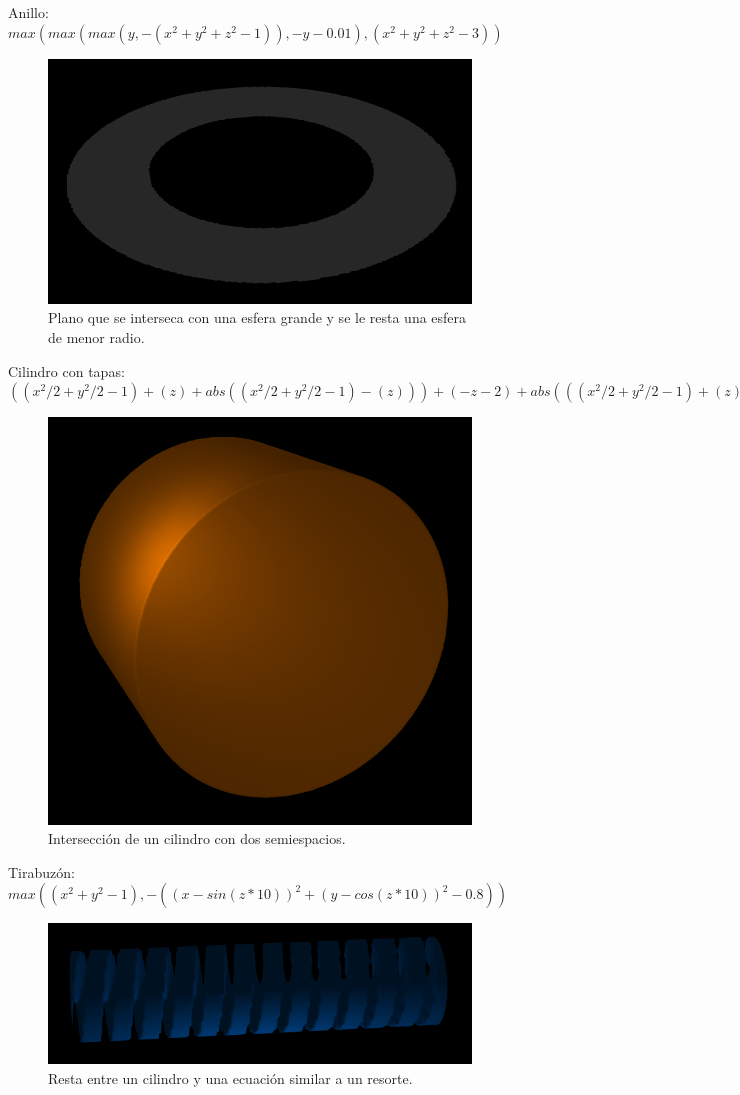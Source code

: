 \documentclass[12pt]{article}
\begin{document}
\clearpage
Anillo: $max(max(max(y,- (x^2 + y^2 + z^2-1)), -y- 0.01), (x^2 +y^2 +z^2 - 3))$ \\
\begin{figure}[h!]
\includegraphics[width=0.7\linewidth,center]{g3.png}
\caption{Plano que se interseca con una esfera grande y se le resta una esfera de menor radio.}
\end{figure}
\clearpage
Cilindro con tapas: $((x^2/2 + y^2/2 - 1) + (z) + abs((x^2/2 + y^2/2 - 1)-(z)))+(-z-2)+abs(((x^2/2 + y^2/2 - 1) + (z) + abs((x^2/2 + y^2/2 - 1)-(z)))-(-z-2))$ \\
\begin{figure}[h!]
\includegraphics[width=0.7\linewidth,center]{g4.png}
\caption{Intersección de un cilindro con dos semiespacios.}
\end{figure}
\clearpage
Tirabuzón: $max((x^2 + y^2 - 1) ,-((x-sin(z*10) )^2 + (y -cos (z*10))^2 -0.8))$ \\
\begin{figure}[h!]
\includegraphics[width=0.7\linewidth,center]{g5.png}
\caption{Resta entre un cilindro y una ecuación similar a un resorte.}
\end{figure}
\end{document}
